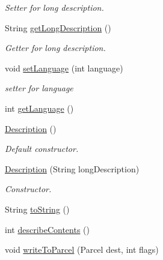 \begin{DoxyCompactItemize}
\begin{DoxyCompactList}\small\item\em Setter for long description. \end{DoxyCompactList}\item 
String \hyperlink{classuk_1_1ac_1_1swan_1_1digitaltrails_1_1components_1_1_description_a511a4f456be165658d2633076093e33f}{get\+Long\+Description} ()
\begin{DoxyCompactList}\small\item\em Getter for long description. \end{DoxyCompactList}\item 
void \hyperlink{classuk_1_1ac_1_1swan_1_1digitaltrails_1_1components_1_1_description_af78324e7f97742764d1bc923ede83256}{set\+Language} (int language)
\begin{DoxyCompactList}\small\item\em setter for language \end{DoxyCompactList}\item 
int \hyperlink{classuk_1_1ac_1_1swan_1_1digitaltrails_1_1components_1_1_description_ac457a3ef04779a5ae5b35cf12a86eab0}{get\+Language} ()
\item 
\hyperlink{classuk_1_1ac_1_1swan_1_1digitaltrails_1_1components_1_1_description_a3efc099ea45ba76ce8bc3ef527bd6bd2}{Description} ()
\begin{DoxyCompactList}\small\item\em Default constructor. \end{DoxyCompactList}\item 
\hyperlink{classuk_1_1ac_1_1swan_1_1digitaltrails_1_1components_1_1_description_a98d2a80ad35b07111f5edcc8c741acef}{Description} (String long\+Description)
\begin{DoxyCompactList}\small\item\em Constructor. \end{DoxyCompactList}\item 
String \hyperlink{classuk_1_1ac_1_1swan_1_1digitaltrails_1_1components_1_1_description_a9ad31ea357759633b5cf66e556d76241}{to\+String} ()
\item 
int \hyperlink{classuk_1_1ac_1_1swan_1_1digitaltrails_1_1components_1_1_description_a5e92acadda5c9486c5edcf6d5c08ee01}{describe\+Contents} ()
\item 
void \hyperlink{classuk_1_1ac_1_1swan_1_1digitaltrails_1_1components_1_1_description_a5a7e133dab94cb699c3fd19727be7d0f}{write\+To\+Parcel} (Parcel dest, int flags)
\end{DoxyCompactItemize}
